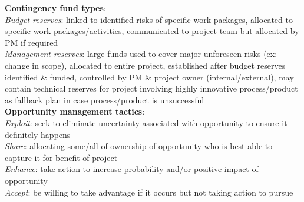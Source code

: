 \documentclass[a4paper]{article}
\begin{document}
\begin{multicols}{2}
        \textbf{Contingency fund types}:\\
        \textit{Budget reserves}: linked to identified risks of specific work packages, allocated to specific work packages/activities, communicated to project team but allocated by PM if required\\
        \textit{Management reserves}: large funds used to cover major unforeseen risks (ex: change in scope), allocated to entire project, established after budget reserves identified \& funded, controlled by PM \& project owner (internal/external), may contain technical reserves for project involving highly innovative process/product as fallback plan in case process/product is unsuccessful\\
        \textbf{Opportunity management tactics}:\\
        \textit{Exploit}: seek to eliminate uncertainty associated with opportunity to ensure it definitely happens\\
        \textit{Share}: allocating some/all of ownership of opportunity who is best able to capture it for benefit of project\\
        \textit{Enhance}: take action to increase probability and/or positive impact of opportunity\\
        \textit{Accept}: be willing to take advantage if it occurs but not taking action to pursue\\
    \end{multicols}
    
\end{document}
